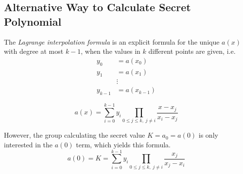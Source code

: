 \subsection{Alternative Way to Calculate Secret Polynomial}\label{subsec:Alternative_Calculate_Secret_Polynomial}
\begin{definition}\label{def:Lagrange_Interpolation_Formula}
  The \emph{Lagrange interpolation formula} is an explicit formula for the unique  $a(x)$ with degree at most $k-1$, when the values in $k$ different points are given, i.e.
  \begin{align*}
    y_{0} &= a(x_{0}) \\
    y_{1} &= a(x_{1}) \\
          &\vdots \\
    y_{k-1} &= a(x_{k-1})
  \end{align*}

  \begin{equation}\label{eq:Lagrange_Interpolation_Formula}
    a(x) = \sum\limits_{i=0}^{k-1} y_{i} \prod\limits_{0 \leq j \leq k,\; j \neq i} \frac{x-x_{j}}{x_{i}-x_{j}}
  \end{equation}
\end{definition}

However, the group calculating the secret value $K = a_{0} = a(0)$ is only interested in the $a(0)$ term, which yields this formula.
\begin{equation}\label{eq:Lagrange_Interpolation_Formula-Useful}
  a(0) = K = \sum\limits_{i=0}^{k-1} y_{i} \prod\limits_{0 \leq j \leq k,\; j \neq i} \frac{x_{j}}{x_{j}-x_{i}}
\end{equation}

